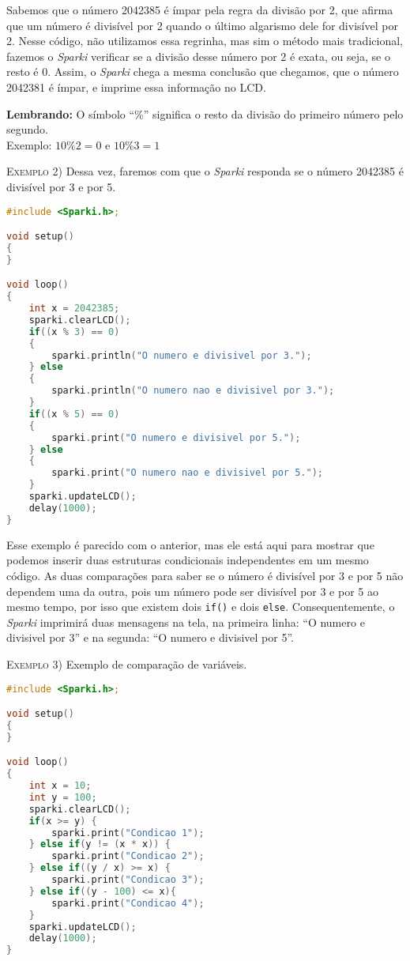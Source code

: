     Sabemos que o número 2042385 é ímpar pela regra da divisão por 2, que afirma que um número é divisível por 2 quando o último algarismo dele for divisível por 2. Nesse código, não utilizamos essa regrinha, mas sim o método mais tradicional, fazemos o \textsl{Sparki} verificar se a divisão desse número por 2 é exata, ou seja, se o resto é 0. Assim, o \textsl{Sparki} chega a mesma conclusão que chegamos, que o número 2042381 é ímpar, e imprime essa informação no LCD.
    
    \begin{center}
    \textcolor{mydarkblue!80!black}{\textbf{Lembrando:}}
    O símbolo ``\%'' significa o resto da divisão do primeiro número pelo segundo.
    \\ Exemplo:
    $10\%2 = 0$ e $10\%3 = 1$
    \end{center}
    
    \textsc{Exemplo 2)} Dessa vez, faremos com que o \textsl{Sparki} responda se o número 2042385 é divisível por 3 e por 5.
    
    \begin{lstlisting}[language=C]
#include <Sparki.h>;

void setup()
{
}

void loop()
{
    int x = 2042385;
    sparki.clearLCD();
    if((x % 3) == 0) 
    {
        sparki.println("O numero e divisivel por 3.");
    } else 
    {
        sparki.println("O numero nao e divisivel por 3.");
    }
    if((x % 5) == 0) 
    {
        sparki.print("O numero e divisivel por 5.");
    } else 
    {
        sparki.print("O numero nao e divisivel por 5.");
    }
    sparki.updateLCD();
    delay(1000);
}
\end{lstlisting}

    
    Esse exemplo é parecido com o anterior, mas ele está aqui para mostrar que podemos inserir duas estruturas condicionais independentes em um mesmo código. As duas comparações para saber se o número é divisível por 3 e por 5 não dependem uma da outra, pois um número pode ser divisível por 3 e por 5 ao mesmo tempo, por isso que existem dois \lstinline[columns=fixed]{if()} e dois \lstinline[columns=fixed]{else}. Consequentemente, o \textsl{Sparki} imprimirá duas mensagens na tela, na primeira linha: ``O numero e divisivel por 3'' e na segunda: ``O numero e divisivel por 5''.
    
    \textsc{Exemplo 3)} Exemplo de comparação de variáveis.
    
    \begin{lstlisting}[language=C]
#include <Sparki.h>;

void setup()
{
}

void loop()
{
    int x = 10;
    int y = 100;
    sparki.clearLCD();
    if(x >= y) {
        sparki.print("Condicao 1");
    } else if(y != (x * x)) {
        sparki.print("Condicao 2");
    } else if((y / x) >= x) {
        sparki.print("Condicao 3");
    } else if((y - 100) <= x){
        sparki.print("Condicao 4");
    }
    sparki.updateLCD();
    delay(1000);
}
\end{lstlisting}

